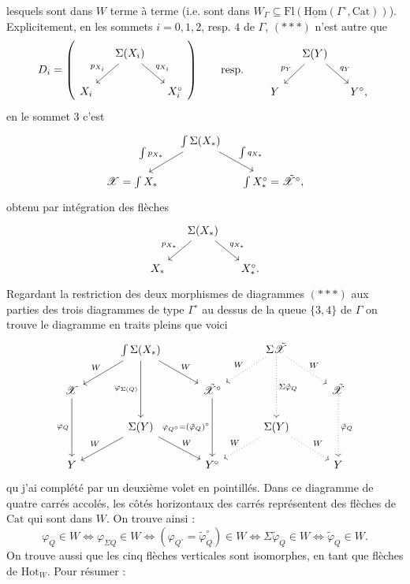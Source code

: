 \documentclass[11pt]{article}
\newcommand{\printedpage}[1]{\marginpar{\footnotesize p.~#1}}
\newcommand{\msp}[1]{\marginpar{\footnotesize [#1]}}
\newcommand{\Hot}{\mathrm{Hot}}
\newcommand{\Cat}{\mathrm{Cat}}
\newcommand{\sX}{\mathscr{X}}
\newcommand{\Hom}{\mathrm{Hom}}
\newcommand{\Fl}{\mathrm{Fl}}
\newcommand{\tsX}{\tilde{\mathscr{X}}}
\begin{document}
lesquels sont dans $W$ terme à terme (i.e. sont dans $W_\Gamma\subseteq\Fl(\underline{\Hom}(\Gamma^\circ,\Cat))$). Explicitement, en les sommets $i=0,1,2$, resp. $4$ de $\Gamma$, $(***)$ n'est autre que
\[
D_i =
\left(
\begin{tikzcd}[column sep=small]
 & \Sigma(X_i) \arrow[dl, "p_{X_i}"'] \arrow[dr, "q_{X_i}"] & \\
X_i & & X_i^\circ
\end{tikzcd}
\right)
\qquad \text{resp.} \qquad
\begin{tikzcd}[column sep=small]
 & \Sigma(Y) \arrow[dl, "p_Y"'] \arrow[dr, "q_Y"] & \\
Y & & Y^\circ,
\end{tikzcd}
\]
en le sommet 3 c'est
\[
\begin{tikzcd}[column sep=small]
 & \int\Sigma(X_*) \arrow[dl, "\int p_{X_*}"'] \arrow[dr, "\int q_{X_*}"] & \\
\sX=\int X_* & & \int X_*^\circ=\tsX^\circ,
\end{tikzcd}
\]
obtenu par intégration des flèches
\[
\begin{tikzcd}[column sep=small]
 & \Sigma(X_*) \arrow[dl, "p_{X_*}"'] \arrow[dr, "q_{X_*}"] & \\
X_* & & X_*^\circ.
\end{tikzcd}
\]
\msp{page 140}
Regardant la restriction des deux morphismes de diagrammes $(***)$ aux parties des trois diagrammes de type $\Gamma^\circ$ au dessus de la queue $\{3,4\}$ de $\Gamma$ on trouve le diagramme en traits pleins que voici
\[
\begin{tikzcd}[column sep=3em, row sep=normal]
 & \int\Sigma(X_*) \arrow[dl, "W"'] \arrow[dr, "W"] \arrow[dd, "\varphi_{\Sigma(Q)}"'] & & \Sigma\tsX \arrow[dl, dotted, "W"'] \arrow[dr, dotted, "W"] \arrow[dd, dotted, "\Sigma\tilde{\varphi}_Q"] & \\
\sX \arrow[dd, "\varphi_Q"'] & & \tsX^\circ \arrow[dd, "\varphi_{Q^\circ}=(\tilde{\varphi}_Q)^\circ"'] & & \tsX \arrow[dd, dotted, "\tilde{\varphi}_Q"] \\
 & \Sigma(Y) \arrow[dl, "W"'] \arrow[dr, "W"] & & \Sigma(Y) \arrow[dl, dotted, "W"'] \arrow[dr, dotted, "W"] & \\
Y & & Y^\circ & & Y
\end{tikzcd}
\]
\printedpage{96}
qu j'ai complété par un deuxième volet en pointillés. Dans ce diagramme de quatre carrés accolés, les côtés horizontaux des carrés représentent des flèches de $\Cat$ qui sont dans $W$. On trouve ainsi : %
\[
\varphi_Q\in W \iff \varphi_{\Sigma Q}\in W \iff (\varphi_{Q^\circ}=\tilde{\varphi}_Q^\circ)\in W \iff \Sigma\tilde{\varphi}_Q\in W \iff \tilde{\varphi}_Q\in W.
\]
On trouve aussi que les cinq flèches verticales sont isomorphes, en tant que flèches de $\Hot_W$. Pour résumer :
\end{document}
